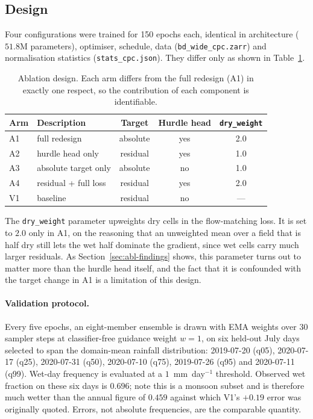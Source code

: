 \subsection{Design}

Four configurations were trained for 150 epochs each, identical in
architecture ($51.8$M parameters), optimiser, schedule, data
(\texttt{bd\_wide\_cpc.zarr}) and normalisation statistics
(\texttt{stats\_cpc.json}). They differ only as shown in
Table~\ref{tab:ablation-design}.

\begin{table}[htbp]
\centering
\caption{Ablation design. Each arm differs from the full redesign (A1) in
exactly one respect, so the contribution of each component is identifiable.}
\label{tab:ablation-design}
\begin{tabular}{llccc}
\hline
Arm & Description & Target & Hurdle head & \texttt{dry\_weight} \\
\hline
A1 & full redesign        & absolute & yes & 2.0 \\
A2 & hurdle head only     & residual & yes & 1.0 \\
A3 & absolute target only & absolute & no  & 1.0 \\
A4 & residual + full loss & residual & yes & 2.0 \\   %
V1 & baseline             & residual & no  & --- \\
\hline
\end{tabular}
\end{table}

The \texttt{dry\_weight} parameter upweights dry cells in the flow-matching
loss. It is set to $2.0$ only in A1, on the reasoning that an unweighted mean
over a field that is half dry still lets the wet half dominate the gradient,
since wet cells carry much larger residuals. As Section~\ref{sec:abl-findings}
shows, this parameter turns out to matter more than the hurdle head itself, and
the fact that it is confounded with the target change in A1 is a limitation of
this design.

\paragraph{Validation protocol.} Every five epochs, an eight-member ensemble is
drawn with EMA weights over 30 sampler steps at classifier-free guidance weight
$w=1$, on six held-out July days selected to span the domain-mean rainfall
distribution: 2019-07-20 (q05), 2020-07-17 (q25), 2020-07-31 (q50), 2020-07-10
(q75), 2019-07-26 (q95) and 2020-07-11 (q99). Wet-day frequency is evaluated at
a $1$~mm~day$^{-1}$ threshold. Observed wet fraction on these six days is
$0.696$; note this is a monsoon subset and is therefore much wetter than the
annual figure of $0.459$ against which V1's $+0.19$ error was originally
quoted. Errors, not absolute frequencies, are the comparable quantity.

